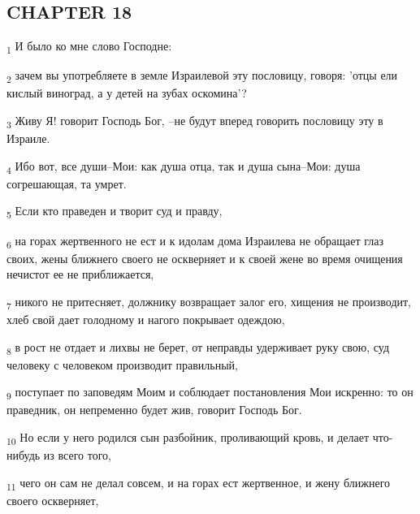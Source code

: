 \subsection{CHAPTER 18}
\begin{tcolorbox}
\textsubscript{1} И было ко мне слово Господне:
\end{tcolorbox}
\begin{tcolorbox}
\textsubscript{2} зачем вы употребляете в земле Израилевой эту пословицу, говоря: 'отцы ели кислый виноград, а у детей на зубах оскомина'?
\end{tcolorbox}
\begin{tcolorbox}
\textsubscript{3} Живу Я! говорит Господь Бог, --не будут вперед говорить пословицу эту в Израиле.
\end{tcolorbox}
\begin{tcolorbox}
\textsubscript{4} Ибо вот, все души--Мои: как душа отца, так и душа сына--Мои: душа согрешающая, та умрет.
\end{tcolorbox}
\begin{tcolorbox}
\textsubscript{5} Если кто праведен и творит суд и правду,
\end{tcolorbox}
\begin{tcolorbox}
\textsubscript{6} на горах жертвенного не ест и к идолам дома Израилева не обращает глаз своих, жены ближнего своего не оскверняет и к своей жене во время очищения нечистот ее не приближается,
\end{tcolorbox}
\begin{tcolorbox}
\textsubscript{7} никого не притесняет, должнику возвращает залог его, хищения не производит, хлеб свой дает голодному и нагого покрывает одеждою,
\end{tcolorbox}
\begin{tcolorbox}
\textsubscript{8} в рост не отдает и лихвы не берет, от неправды удерживает руку свою, суд человеку с человеком производит правильный,
\end{tcolorbox}
\begin{tcolorbox}
\textsubscript{9} поступает по заповедям Моим и соблюдает постановления Мои искренно: то он праведник, он непременно будет жив, говорит Господь Бог.
\end{tcolorbox}
\begin{tcolorbox}
\textsubscript{10} Но если у него родился сын разбойник, проливающий кровь, и делает что-нибудь из всего того,
\end{tcolorbox}
\begin{tcolorbox}
\textsubscript{11} чего он сам не делал совсем, и на горах ест жертвенное, и жену ближнего своего оскверняет,
\end{tcolorbox}
